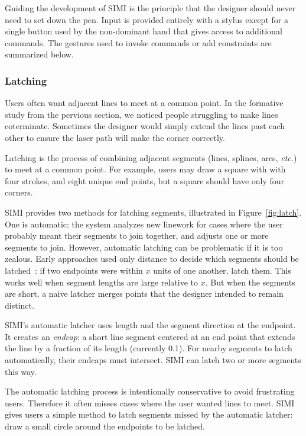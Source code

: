 \documentclass{article}
\begin{document}




Guiding the development of SIMI is the principle that the designer
should never need to set down the pen. Input is provided entirely with
a stylus except for a single button used by the non-dominant hand that
gives access to additional commands. The gestures used to invoke
commands or add constraints are summarized below.

\subsubsection{Latching}

Users often want adjacent lines to meet at a common point. In the
formative study from the pervious section, we noticed people
struggling to make lines coterminate. Sometimes the designer would
simply extend the lines past each other to ensure the laser path will
make the corner correctly.

Latching is the process of combining adjacent segments (lines,
splines, arcs, \textit{etc.}) to meet at a common point. For example,
users may draw a square with with four strokes, and eight unique end
points, but a square should have only four corners.

SIMI provides two methods for latching segments, illustrated in
Figure~\ref{fig:latch}. One is automatic: the system analyzes new
linework for cases where the user probably meant their segments to
join together, and adjusts one or more segments to join. However,
automatic latching can be problematic if it is too zealous. Early
approaches used only distance to decide which segments should be
latched~\cite{herot-latch-corners}: if two endpoints were within $x$
units of one another, latch them. This works well when segment lengths
are large relative to $x$. But when the segments are short, a naive
latcher merges points that the designer intended to remain distinct.

SIMI's automatic latcher uses length and the segment direction at the
endpoint. It creates an \textit{endcap}: a short line segment centered
at an end point that extends the line by a fraction of its length
(currently 0.1). For nearby segments to latch automatically, their
endcaps must intersect. SIMI can latch two or more segments this way.

The automatic latching process is intentionally conservative to avoid
frustrating users. Therefore it often misses cases where the user
wanted lines to meet. SIMI gives users a simple method to latch
segments missed by the automatic latcher: draw a small circle around
the endpoints to be latched.
\end{document}
